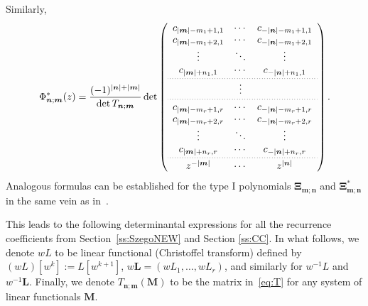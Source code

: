 \documentclass[reqno,centertags,11pt,draft]{amsart}
\newcommand{\abs}[1]{\left|#1\right|}
\begin{document}
    Similarly,
    \begin{equation}\label{eq:HeineII*}
        \Phi^*_{\bm{n};\bm{m}}(z) = \frac{(-1)^{|\bm{n}|+|\bm{m}|}}{\det T_{\bm{n};\bm{m}}}
        \det
          \left(\begin{array}{c c c}
        c_{\abs{\bm{m}}-m_1+1,1} & \cdots & c_{-\abs{\bm{n}}-m_1+1,1} \\
        c_{\abs{\bm{m}}-m_1+2,1} & \cdots & c_{-\abs{\bm{n}}-m_1+2,1} \\
        \vdots & \ddots & \vdots \\
        c_{\abs{\bm{m}}+n_1,1} & \cdots & c_{-\abs{\bm{n}}+n_1,1} %
        \\[0.2em]
        \hdashline[0.5pt/2pt]
        \\[-1.2em]
        & \vdots \\[0.2em]
        \hdashline[0.5pt/2pt]
        \\[-1.0em]
        c_{\abs{\bm{m}}-m_r+1,r} & \cdots & c_{-\abs{\bm{n}}-m_r+1,r} \\
        c_{\abs{\bm{m}}-m_r+2,r} & \cdots & c_{-\abs{\bm{n}}-m_r+2,r} \\
        \vdots & \ddots & \vdots \\
        c_{\abs{\bm{m}}+n_r,r} & \cdots & c_{-\abs{\bm{n}}+n_r,r}
        \\[0.2em]
        \hdashline[0.5pt/2pt]
        \\[-1.0em]
        z^{-|\bm{m}|} & \cdots & z^{|\bm{n}|}
    \end{array}\right).
    \end{equation}
    Analogous formulas can be established for the type I polynomials $\bm{\Xi}_{\bm{m};\bm{n}}$ and $\bm{\Xi}^*_{\bm{m};\bm{n}}$ in the same vein as in~\cite{Kui}.

    This leads to the following determinantal expressions for all the recurrence coefficients from Section~\ref{ss:SzegoNEW} and Section \ref{ss:CC}. In what follows, we denote $wL$ to be linear functional (Christoffel transform) defined by $(wL)[w^k]:=L[w^{k+1}]$, $w\bm{L} = (wL_1,\ldots,wL_r)$, and similarly for $w^{-1}L$ and $w^{-1} \bm{L}$. Finally, we denote $T_{\bm{n};\bm{m}}(\bm{M})$ to be the matrix in~\eqref{eq:T} for any system of linear functionals $\bm{M}$.
\end{document}
